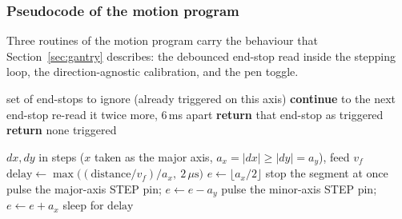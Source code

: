 \subsubsection{Pseudocode of the motion program}

Three routines of the motion program carry the behaviour that Section~\ref{sec:gantry} describes: the debounced end-stop read inside the stepping loop, the direction-agnostic calibration, and the pen toggle.

\begin{algorithm}[!htbp]
\caption{Debounced end-stop read, called before every major-axis pulse}
\label{alg:gan-endstop}
\begin{algorithmic}[1]
\REQUIRE set of end-stops to ignore (already triggered on this axis)
        \STATE \textbf{continue} to the next end-stop
    \ENDIF
    \STATE re-read it twice more, 6\,ms apart 
        \STATE \textbf{return} that end-stop as triggered
    \ENDIF
\ENDFOR
\STATE \textbf{return} none triggered
\end{algorithmic}
\end{algorithm}

\begin{algorithm}[!htbp]
\caption{Interpolated segment with in-loop end-stop check}
\label{alg:gan-step}
\begin{algorithmic}[1]
\REQUIRE $dx,dy$ in steps ($x$ taken as the major axis, $a_x=|dx|\ge|dy|=a_y$), feed $v_f$
\STATE $\mathrm{delay}\leftarrow\max\bigl((\mathrm{distance}/v_f)/a_x,\ 2\,\mu\mathrm{s}\bigr)$ 
\STATE $e\leftarrow\lfloor a_x/2\rfloor$ 
        \STATE stop the segment at once 
    \ENDIF
    \STATE pulse the major-axis STEP pin; $e\leftarrow e-a_y$
        \STATE pulse the minor-axis STEP pin; $e\leftarrow e+a_x$
    \ENDIF
    \STATE sleep for $\mathrm{delay}$
\ENDFOR
\end{algorithmic}
\end{algorithm}

